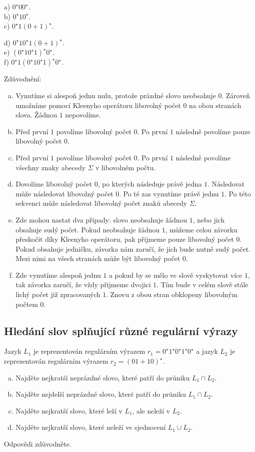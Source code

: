 \begin{multicols}{2}
    a) $0^\star 0 0^\star$.\\
    b) $0^\star 1 0^\star$.\\
    c) $0^\star 1 (0+1)^\star$.
\columnbreak

    d) $0^\star 1 0^\star 1 (0+1)^\star$.\\
    e) $(0^\star 1 0^\star 1)^\star 0^\star$.\\
    f) $0^\star 1 (0^\star 1 0^\star 1)^\star 0^\star$.
\end{multicols}
Zdůvodnění:
\begin{enumerate}[a), noitemsep]
    \item Vynutíme si alespoň jednu nulu, protože prázdné slovo neobsahuje $0$. Zároveň umožníme pomocí Kleenyho 
    operátoru libovolný počet $0$ na obou stranách slova. Žádnou $1$ nepovolíme.
    \item Před první $1$ povolíme libovolný počet $0$. Po první $1$ následně povolíme pouze libovolný počet $0$.
    \item Před první $1$ povolíme libovolný počet $0$. Po první $1$ následně povolíme všechny znaky abecedy 
    $\Sigma$ v libovolném počtu.
    \item Dovolíme libovolný počet $0$, po kterých následuje právě jedna $1$. Následovat může následovat libovolný počet 
    $0$. Po té zas vynutíme právě jednu $1$. Po této sekvenci může následovat libovolný počet znaků abecedy $\Sigma$.
    \item Zde mohou nastat dva případy: slovo neobsahuje žádnou $1$, nebo jich obsahuje sudý počet. Pokud neobsahuje 
    žádnou $1$, můžeme celou závorku přeskočit díky Kleenyho operátoru, pak přijmeme pouze libovolný počet $0$. Pokud 
    obsahuje jedničku, závorka nám zaručí, že jich bude nutně sudý počet. Mezi nimi na všech stranách může být libovolný
    počet $0$.
    \item Zde vynutíme alespoň jednu $1$ a pokud by se mělo ve slově vyskytovat více $1$, tak závorka zaručí, že vždy
    přijmeme dvojici $1$. Tím bude v celém slově stále lichý počet již zpracovaných $1$. Znovu z obou stran obklopeny 
    libovolným počtem $0$.
\end{enumerate}

\subsection{Hledání slov splňující různé regulární výrazy}
Jazyk $L_1$ je reprezentován regulárním výrazem $r_1 = 0^\star1^\star0^\star1^\star0^\star$ a jazyk $L_2$ je reprezentován
regulárním výrazem $r_2 = (01 + 10)^\star$.
\begin{enumerate}[a), noitemsep]
    \item Najděte nejkratší neprázdné slovo, které patří do průniku $L_1 \cap L_2$.
    \item Najděte nejdelší neprázdné slovo, které patří do průniku $L_1 \cap L_2$.
    \item Najděte nejkratší slovo, které leží v $L_1$, ale neleží v $L_2$.
    \item Najděte nejkratší slovo, které neleží ve sjednocení $L_1 \cup L_2$.
\end{enumerate}
Odpovědi zdůvodněte.

